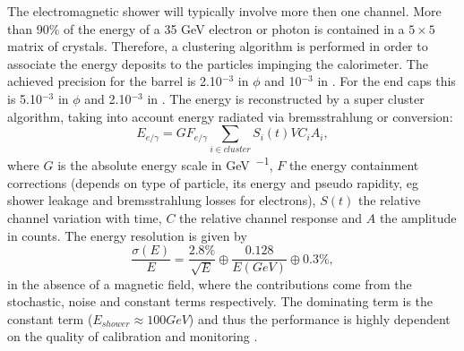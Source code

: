 The electromagnetic shower will typically involve more then one channel. More than 90\% of the energy of a 35 \si{ \GeV} electron or photon is contained in a $5\times 5$ matrix of crystals. Therefore, a clustering algorithm is performed in order to associate the energy deposits to the particles impinging the calorimeter.
The achieved precision\cite{1748-0221-12-01-C01069} for the barrel is 2.10$^{-3}$ \si{ \rad} in $\phi$ and 10$^{-3}$ in \psrap. For the end caps this is 5.10$^{-3}$ \si{ \rad} in $\phi$ and 2.10$^{-3}$ in \psrap. The energy is reconstructed by a super cluster algorithm, taking into account energy radiated via bremsstrahlung or conversion: 
\begin{equation}
E_{e/\gamma} = G F_{e/\gamma} \sum_{i \in cluster} S_i(t) VC_i A_i,
\end{equation}
where $G$ is the absolute energy scale in \si{ \GeV \per \ADC}, $F$ the energy containment corrections (depends on type of particle, its energy and pseudo rapidity, eg shower leakage and bremsstrahlung losses for electrons), $S(t)$ the relative channel variation with time, $C$ the relative channel response and $A$ the amplitude in \si{ \ADC} counts. The energy resolution is given by 
\begin{equation}
\frac{\sigma(E)}{E} = \frac{2.8\%}{\sqrt{E}}\oplus \frac{0.128}{E(GeV)} \oplus 0.3\%, 
\end{equation}
in the absence of a magnetic field, where the contributions come from the stochastic, noise and constant terms respectively. The dominating term is the constant term ($E_{shower} \approx 100 GeV$) and thus the performance is highly dependent on the quality of calibration and monitoring .

